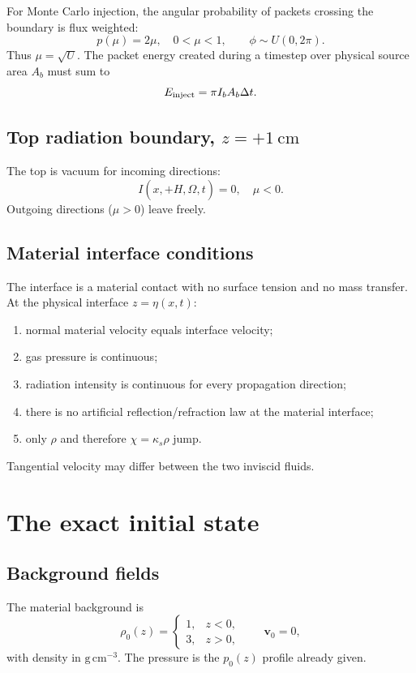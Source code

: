 \documentclass[11pt]{article}
\newcommand{\vect}[1]{\bm{#1}}
\newcommand{\Oh}{\hat{\Omega}}
\begin{document}
For Monte Carlo injection, the angular probability of packets crossing the boundary is flux weighted:
\begin{equation}
p(\mu)=2\mu,\quad 0<\mu<1,\qquad \phi\sim U(0,2\pi).
\end{equation}
Thus $\mu=\sqrt U$. The packet energy created during a timestep over physical source area $A_b$ must sum to
\begin{equation}
E_{\rm inject}=\pi I_b A_b\Delta t.
\end{equation}

\subsection{Top radiation boundary, $z=+1\ \mathrm{cm}$}
The top is vacuum for incoming directions:
\begin{equation}
\boxed{I(x,+H,\Oh,t)=0,\quad \mu<0.}
\end{equation}
Outgoing directions ($\mu>0$) leave freely.

\subsection{Material interface conditions}
The interface is a material contact with no surface tension and no mass transfer. At the physical interface $z=\eta(x,t)$:
\begin{enumerate}[leftmargin=2em]
\item normal material velocity equals interface velocity;
\item gas pressure is continuous;
\item radiation intensity is continuous for every propagation direction;
\item there is no artificial reflection/refraction law at the material interface;
\item only $\rho$ and therefore $\chi=\kappa_s\rho$ jump.
\end{enumerate}
Tangential velocity may differ between the two inviscid fluids.

\section{The exact initial state}

\subsection{Background fields}
The material background is
\begin{equation}
\rho_0(z)=\begin{cases}1,&z<0,\\3,&z>0,\end{cases}\qquad \vect v_0=0,
\end{equation}
with density in $\mathrm{g\,cm^{-3}}$. The pressure is the $p_0(z)$ profile already given.
\end{document}
